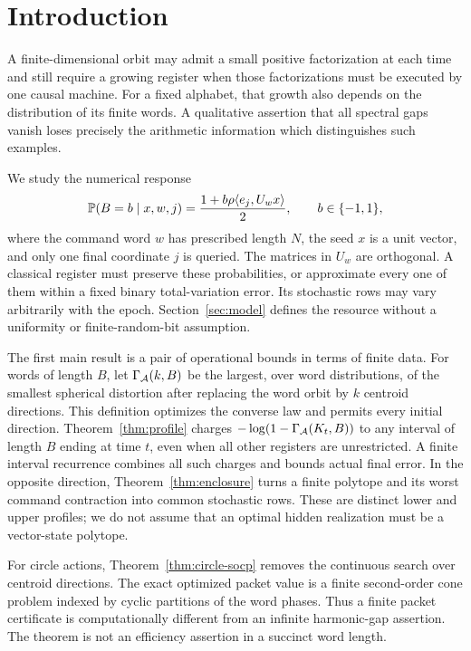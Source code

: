 \section{Introduction}
A finite-dimensional orbit may admit a small positive factorization at each time and still require a growing register when those factorizations must be executed by one causal machine. For a fixed alphabet, that growth also depends on the distribution of its finite words. A qualitative assertion that all spectral gaps vanish loses precisely the arithmetic information which distinguishes such examples.

We study the numerical response
\begin{equation}\label{eq:target}
 \mathbb P(B=b\mid x,w,j)=\frac{1+b\rho\langle e_j,U_wx\rangle}2,
 \qquad b\in\{-1,1\},
\end{equation}
where the command word $w$ has prescribed length $N$, the seed $x$ is a unit vector, and only one final coordinate $j$ is queried. The matrices in $U_w$ are orthogonal. A classical register must preserve these probabilities, or approximate every one of them within a fixed binary total-variation error. Its stochastic rows may vary arbitrarily with the epoch. Section~\ref{sec:model} defines the resource without a uniformity or finite-random-bit assumption.

The first main result is a pair of operational bounds in terms of finite data. For words of length $B$, let $\Gamma_{\mathcal A}(k,B)$ be the largest, over word distributions, of the smallest spherical distortion after replacing the word orbit by $k$ centroid directions. This definition optimizes the converse law and permits every initial direction. Theorem~\ref{thm:profile} charges $-\log(1-\Gamma_{\mathcal A}(K_t,B))$ to any interval of length $B$ ending at time $t$, even when all other registers are unrestricted. A finite interval recurrence combines all such charges and bounds actual final error. In the opposite direction, Theorem~\ref{thm:enclosure} turns a finite polytope and its worst command contraction into common stochastic rows. These are distinct lower and upper profiles; we do not assume that an optimal hidden realization must be a vector-state polytope.

For circle actions, Theorem~\ref{thm:circle-socp} removes the continuous search over centroid directions. The exact optimized packet value is a finite second-order cone problem indexed by cyclic partitions of the word phases. Thus a finite packet certificate is computationally different from an infinite harmonic-gap assertion. The theorem is not an efficiency assertion in a succinct word length.

